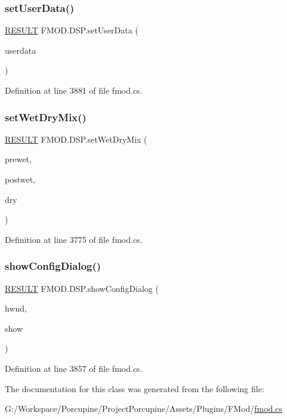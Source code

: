 \subsubsection{\texorpdfstring{set\+User\+Data()}{setUserData()}}
{\footnotesize\ttfamily \hyperlink{namespace_f_m_o_d_a305d1176ef3f8c8815861a60407ac33d}{R\+E\+S\+U\+LT} F\+M\+O\+D.\+D\+S\+P.\+set\+User\+Data (\begin{DoxyParamCaption}\item[{Int\+Ptr}]{userdata }\end{DoxyParamCaption})}



Definition at line 3881 of file fmod.\+cs.

\mbox{\label{class_f_m_o_d_1_1_d_s_p_a1e4aa96dc5b5082f506adbb913c1bc6f}} 
\subsubsection{\texorpdfstring{set\+Wet\+Dry\+Mix()}{setWetDryMix()}}
{\footnotesize\ttfamily \hyperlink{namespace_f_m_o_d_a305d1176ef3f8c8815861a60407ac33d}{R\+E\+S\+U\+LT} F\+M\+O\+D.\+D\+S\+P.\+set\+Wet\+Dry\+Mix (\begin{DoxyParamCaption}\item[{float}]{prewet,  }\item[{float}]{postwet,  }\item[{float}]{dry }\end{DoxyParamCaption})}



Definition at line 3775 of file fmod.\+cs.

\mbox{\label{class_f_m_o_d_1_1_d_s_p_ab7dddd8b248f1b83464cc984094bffb0}} 
\subsubsection{\texorpdfstring{show\+Config\+Dialog()}{showConfigDialog()}}
{\footnotesize\ttfamily \hyperlink{namespace_f_m_o_d_a305d1176ef3f8c8815861a60407ac33d}{R\+E\+S\+U\+LT} F\+M\+O\+D.\+D\+S\+P.\+show\+Config\+Dialog (\begin{DoxyParamCaption}\item[{Int\+Ptr}]{hwnd,  }\item[{bool}]{show }\end{DoxyParamCaption})}



Definition at line 3857 of file fmod.\+cs.



The documentation for this class was generated from the following file\+:\begin{DoxyCompactItemize}
\item 
G\+:/\+Workspace/\+Porcupine/\+Project\+Porcupine/\+Assets/\+Plugins/\+F\+Mod/\hyperlink{fmod_8cs}{fmod.\+cs}\end{DoxyCompactItemize}
